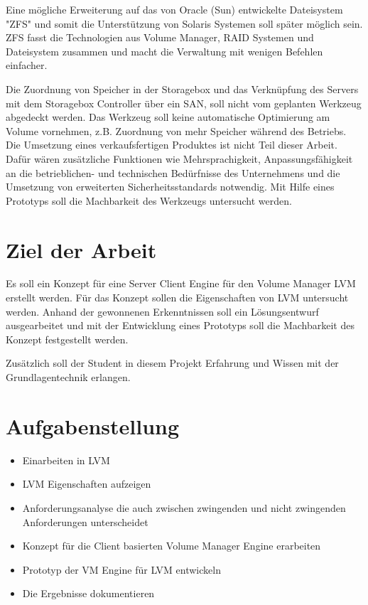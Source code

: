 Eine mögliche Erweiterung auf das von Oracle (Sun) entwickelte Dateisystem "ZFS" und somit die Unterstützung von Solaris Systemen soll später möglich sein. ZFS fasst die Technologien aus Volume Manager, RAID Systemen und Dateisystem zusammen und macht die Verwaltung mit wenigen Befehlen einfacher.

Die Zuordnung von Speicher in der Storagebox und das Verknüpfung des Servers mit dem Storagebox Controller über ein SAN, soll nicht vom geplanten Werkzeug abgedeckt werden. Das Werkzeug soll keine automatische Optimierung am Volume vornehmen, z.B. Zuordnung von mehr Speicher während des Betriebs. Die Umsetzung eines verkaufsfertigen Produktes ist nicht Teil dieser Arbeit. Dafür wären zusätzliche Funktionen wie Mehrsprachigkeit, Anpassungsfähigkeit an die betrieblichen- und technischen Bedürfnisse des Unternehmens und die Umsetzung von erweiterten Sicherheitsstandards notwendig. Mit Hilfe eines Prototyps soll die Machbarkeit des Werkzeugs untersucht werden.

\section{Ziel der Arbeit}

Es soll ein Konzept für eine Server Client Engine für den Volume Manager LVM erstellt werden. Für das Konzept sollen die Eigenschaften von LVM untersucht werden. Anhand der gewonnenen Erkenntnissen soll ein Lösungsentwurf ausgearbeitet und mit der Entwicklung eines Prototyps soll die Machbarkeit des Konzept festgestellt werden.

Zusätzlich soll der Student in diesem Projekt Erfahrung und Wissen mit der Grundlagentechnik erlangen.

\section{Aufgabenstellung}
\begin{itemize}
\item Einarbeiten in LVM
\item LVM Eigenschaften aufzeigen
\item Anforderungsanalyse die auch zwischen zwingenden und nicht zwingenden Anforderungen unterscheidet
\item Konzept für die Client basierten Volume Manager Engine erarbeiten
\item Prototyp der VM Engine für LVM entwickeln
\item Die Ergebnisse dokumentieren
\end{itemize}

